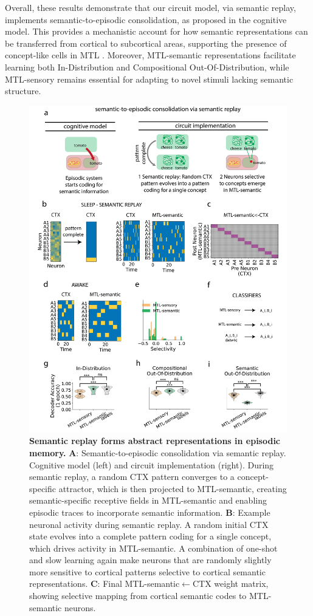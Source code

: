 \documentclass{article}
\begin{document}
\newline\newline
Overall, these results demonstrate that our circuit model, via semantic replay, implements semantic-to-episodic consolidation, as proposed in the cognitive model. This provides a mechanistic account for how semantic representations can be transferred from cortical to subcortical areas, supporting the presence of concept-like cells in MTL . Moreover, MTL-semantic representations facilitate learning both In-Distribution and Compositional Out-Of-Distribution, while MTL-sensory remains essential for adapting to novel stimuli lacking semantic structure.
\begin{figure}
    \centering
    \includegraphics[width=\linewidth]{Figures/Figure_3.png}
\caption{\textbf{Semantic replay forms abstract representations in episodic memory.} \textbf{A}: Semantic-to-episodic consolidation via semantic replay. Cognitive model (left) and circuit implementation (right). During semantic replay, a random CTX pattern converges to a concept-specific attractor, which is then projected to MTL-semantic, creating semantic-specific receptive fields in MTL-semantic and enabling episodic traces to incorporate semantic information.  
\textbf{B}: Example neuronal activity during semantic replay. A random initial CTX state evolves into a complete pattern coding for a single concept, which drives activity in MTL-semantic. A combination of one-shot and slow learning again make neurons that are randomly slightly more sensitive to cortical patterns selective to cortical semantic representations. 
\textbf{C}: Final MTL-semantic$\leftarrow$CTX weight matrix, showing selective mapping from cortical semantic codes to MTL-semantic neurons.}
    \label{fig:phase_b}
\end{figure}
\end{document}
